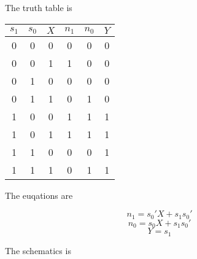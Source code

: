 The truth table is 

\begin{center}
\begin{tabular}{ccc|ccc}
$s_{1}$ & $s_{0}$ & $X$ & $n_{1}$ & $n_{0}$ & $Y$ \\
\hline
0 & 0 & 0 & 0 & 0 & 0 \\
0 & 0 & 1 & 1 & 0 & 0 \\
0 & 1 & 0 & 0 & 0 & 0 \\
0 & 1 & 1 & 0 & 1 & 0 \\
1 & 0 & 0 & 1 & 1 & 1 \\
1 & 0 & 1 & 1 & 1 & 1 \\
1 & 1 & 0 & 0 & 0 & 1 \\
1 & 1 & 1 & 0 & 1 & 1 \\
\end{tabular}
\end{center}

The euqations are 

$$n_{1}=s_{0}'X+s_{1}s_{0}'$$
$$n_{0}=s_{0}X+s_{1}s_{0}'$$
$$Y=s_{1}$$


The schematics is 


